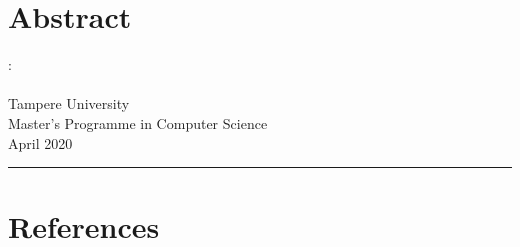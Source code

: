 
\chapter*{Abstract}

\begin{spacing}{1.0}
\noindent \@author: \@title\\
\@thesistype\\
Tampere University\\
Master's Programme in Computer Science\\
April 2020
\end{spacing}
\noindent\rule{12cm}{0.4pt}

\vspace{0.5cm}






% 








\setcounter{tocdepth}{3}              %
\tableofcontents                      %
\clearpage


\setcounter{page}{4} %
                     
                     
                     


% 




%
%
\clearpage

\chapter{References}
\printbibliography[heading=none]

